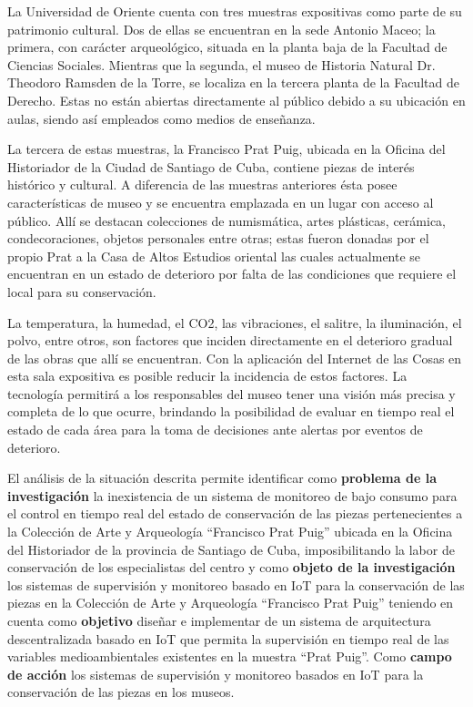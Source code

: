     La Universidad de Oriente cuenta con tres muestras expositivas como parte de su patrimonio cultural. Dos de ellas se encuentran en la sede Antonio Maceo; la primera, con carácter arqueológico, situada en la planta baja de la Facultad de Ciencias Sociales. Mientras que la segunda, el museo de Historia Natural Dr. Theodoro Ramsden de la Torre, se localiza en la tercera planta de la Facultad de Derecho. Estas no están abiertas directamente al público debido a su ubicación en aulas, siendo así empleados como medios de enseñanza.

    La tercera de estas muestras, la Francisco Prat Puig, ubicada en la Oficina del Historiador de la Ciudad de Santiago de Cuba, contiene piezas de interés histórico y cultural. A diferencia de las muestras anteriores ésta posee características de museo y se encuentra emplazada en un lugar con acceso al público. Allí se destacan colecciones de numismática, artes plásticas, cerámica, condecoraciones, objetos personales entre otras; estas fueron donadas por el propio Prat a la Casa de Altos Estudios oriental las cuales actualmente se encuentran en un estado de deterioro por falta de las condiciones que requiere el local para su conservación.

    La temperatura, la humedad, el CO2, las vibraciones, el salitre, la iluminación, el polvo, entre otros, son factores que inciden directamente en el deterioro gradual de las obras que allí se encuentran. Con la aplicación del Internet de las Cosas en esta sala expositiva es posible reducir la incidencia de estos factores. La tecnología permitirá a los responsables del museo tener una visión más precisa y completa de lo que ocurre, brindando la posibilidad de evaluar en tiempo real el estado de cada área para la toma de decisiones ante alertas por eventos de deterioro.
    
    El análisis de la situación descrita permite identificar como \textbf{problema de la investigación} la inexistencia de un sistema de monitoreo de bajo consumo para el control en tiempo real del estado de conservación de las piezas pertenecientes a la Colección de Arte y Arqueología “Francisco Prat Puig” ubicada en la Oficina del Historiador de la provincia de Santiago de Cuba, imposibilitando la labor de conservación de los especialistas del centro y como
    \textbf{objeto de la investigación} los sistemas de supervisión y monitoreo basado en IoT para la conservación de las piezas en la Colección de Arte y Arqueología “Francisco Prat Puig” teniendo en cuenta como \textbf{objetivo} diseñar e implementar de un sistema de arquitectura descentralizada basado en IoT que permita la supervisión en tiempo real de las variables medioambientales existentes en la muestra “Prat Puig”. Como \textbf{campo de acción} los sistemas de supervisión y monitoreo basados en IoT para la conservación de las piezas en los museos.

